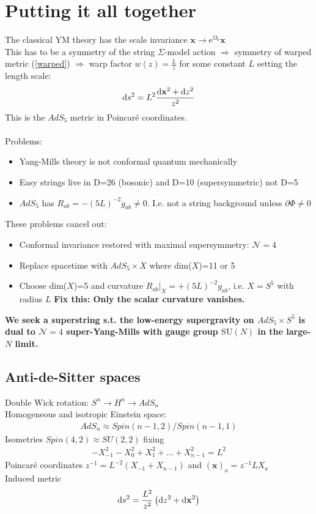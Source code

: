 \documentclass[12pt]{article}
\begin{document}
\section{Putting it all together}
The classical YM theory has the scale invariance $\mathbf x \to \mathrm e^{\Omega_0} \mathbf x$\\
This has to be a symmetry of the string $\Sigma$-model action $\Rightarrow$ symmetry of warped metric (\ref{warped}) $\Rightarrow$ warp factor $w(z) = \frac Lz$ for some constant $L$ setting the length scale:
\begin{eqnarray}
\mathrm d s^2 = L^2 {\mathrm d \mathbf x^2 +\mathrm dz^2\over z^2}
\end{eqnarray}
This is the $AdS_5$ metric in Poincar\'e coordinates. \\
\\
Problems:
\begin{itemize}
\item Yang-Mills theory is not conformal quantum mechanically
\item Easy strings live in D=26 (bosonic) and D=10 (supersymmetric) not D=5
\item $AdS_5$ has $R_{ab}= - (5 L)^{-2} g_{ab} \neq 0$. I.e. not a string background unless $\partial \Phi\neq 0$
\end{itemize}
These problems cancel out:
\begin{itemize}
\item Conformal invariance restored with maximal supersymmetry: $\mathcal N=4$
\item Replace spacetime with $AdS_5 \times X$ where dim($X$)=11 or 5
\item Choose dim($X$)=5 and curvature $R_{ab}|_X = + (5 L)^{-2} g_{ab}$, i.e. $X = S^5$ with radius $L$ {\bf Fix this: Only the scalar curvature vanishes.}
\end{itemize}

{\bf We seek a superstring s.t. the low-energy supergravity on $AdS_5\times S^5$ is dual to $\mathcal N=4$ super-Yang-Mills with gauge group $\mathrm {SU}(N)$ in the large-$N$ limit.}

\subsection{Anti-de-Sitter spaces}
Double Wick rotation: $S^n \to H^n \to AdS_n$\\
Homogeneous and isotropic Einstein space:
\begin{eqnarray}
AdS_n\approx Spin(n-1,2)\Big/ Spin(n-1,1)
\end{eqnarray}
Isometries $Spin(4,2)\approx SU(2,2)$ fixing 
\begin{eqnarray}
-X_{-1}^2 - X_0^2 + X_1^2 +\dots +X_{n-1}^2 = L^2
\end{eqnarray}
Poincar\'e coordinates $z^{-1}= L^{-2} (X_{-1} + X_{n-1})$ and $(\mathbf x)_a= z^{-1}L X_a$\\
Induced metric
\begin{eqnarray}
\mathrm d s^2 = {L^2\over z^2}\left( \mathrm d z^2 + \mathrm d\mathbf x^2\right)
\end{eqnarray}
\end{document}
